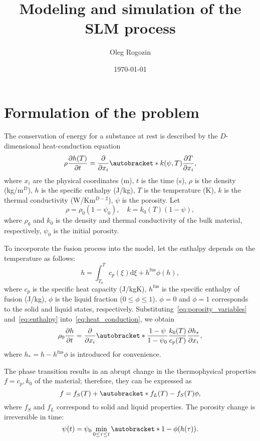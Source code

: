 \documentclass{article}
\title{Modeling and simulation of the SLM process}
\date{\today}
\author{Oleg Rogozin}
\newcommand{\dd}{\mathrm{d}}
\newcommand{\pder}[2][]{\frac{\partial#1}{\partial#2}}
\DeclarePairedDelimiter\autobracket()       %
\newcommand{\br}[1]{\autobracket*{#1}}
\newcommand{\fusion}[1]{{#1}^\mathrm{fus}}
\begin{document}
\maketitle
\tableofcontents

\section{Formulation of the problem}

The conservation of energy for a substance at rest is described by the \(D\)-dimensional heat-conduction equation
\begin{equation}\label{eq:heat_conduction}
	\rho\pder[h(T)]{t} = \pder{x_i}\br{ k(\psi,T)\pder[T]{x_i} },
\end{equation}
where \(x_i\) are the physical coordinates (\si{m}), \(t\) is the time (\si{s}),
\(\rho\) is the density (\si{kg/m}\(^D\)), \(h\) is the specific enthalpy (\si{J/kg}),
\(T\) is the temperature (\si{\K}), \(k\) is the thermal conductivity (\si{W/Km}\(^{D-2}\)),
\(\psi\) is the porosity. Let
\begin{equation}\label{eq:porosity_variables}
	\rho = \rho_0(1-\psi_0), \quad k = k_0(T)(1-\psi),
\end{equation}
where \(\rho_0\) and \(k_0\) is the density and thermal conductivity of the bulk material, respectively,
\(\psi_0\) is the initial porosity.

To incorporate the fusion process into the model, let the enthalpy depends on the temperature as follows:
\begin{equation}\label{eq:enthalpy}
	h = \int_{T_0}^T c_p(\xi)\dd\xi + \fusion{h}\phi(h),
\end{equation}
where \(c_p\) is the specific heat capacity (\si{J/kgK}), \(\fusion{h}\) is the specific enthalpy of fusion (\si{J/kg}),
\(\phi\) is the liquid fraction (\(0 \leq \phi \leq 1\)).
\(\phi=0\) and \(\phi=1\) corresponds to the solid and liquid states, respectively.
Substituting~\eqref{eq:porosity_variables} and~\eqref{eq:enthalpy} into~\eqref{eq:heat_conduction}, we obtain
\begin{equation}\label{eq:heat_conduction2}
	\rho_0\pder[h]{t} = \pder{x_i}\br{ \frac{1-\psi}{1-\psi_0} \frac{k_0(T)}{c_p(T)}\pder[h_*]{x_i} },
\end{equation}
where \(h_* = h - \fusion{h}\phi\) is introduced for convenience.

The phase transition results in an abrupt change in the thermophysical properties \(f=c_p,k_0\) of the material;
therefore, they can be expressed as
\begin{equation}\label{eq:fusion_change}
	f = f_S(T) + \br{ f_L(T) - f_S(T)}\phi,
\end{equation}
where \(f_S\) and \(f_L\) correspond to solid and liquid properties.
The porosity change is irreversible in time:
\begin{equation}\label{eq:porosity}
	\psi(t) = \psi_0\min_{0\leq\tau\leq t}\br{ 1-\phi(h(\tau)) }.
\end{equation}
\end{document}
